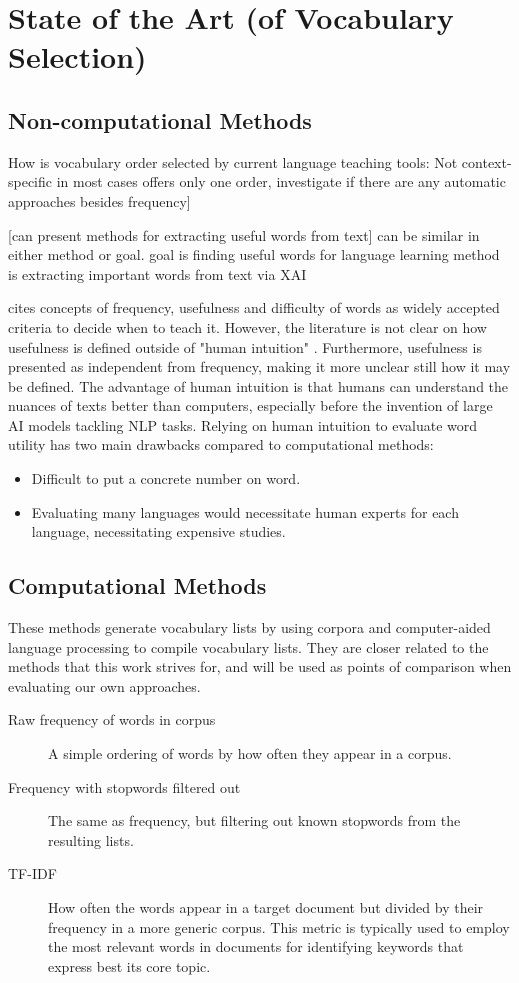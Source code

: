 \section{State of the Art (of Vocabulary Selection)} \label{sec:state-of-the-art-vocabulary-selection}
\subsection{Non-computational Methods}
How is vocabulary order selected by current language teaching tools:
Not context-specific in most cases
offers only one order,
investigate if there are any automatic approaches besides frequency]

[can present methods for extracting useful words from text]
can be similar in either method or goal.
goal is finding useful words for language learning
method is extracting important words from text via XAI

\cite{heChoosingWordsTeach2019} cites concepts of frequency, usefulness and difficulty of words as widely accepted criteria to decide when to teach it.
However, the literature is not clear on how usefulness is defined outside of "human intuition" \cite{heChoosingWordsTeach2019}.
Furthermore, usefulness is presented as independent from frequency, making it more unclear still how it may be defined.
The advantage of human intuition is that humans can understand the nuances of texts better than computers, especially before the invention of large AI models tackling NLP tasks.
Relying on human intuition to evaluate word utility has two main drawbacks compared to computational methods:
\begin{itemize}
	\item Difficult to put a concrete number on word.
	\item Evaluating many languages would necessitate human experts for each language, necessitating expensive studies.
\end{itemize}

\subsection{Computational Methods}
These methods generate vocabulary lists by using corpora and computer-aided language processing to compile vocabulary lists.
They are closer related to the methods that this work strives for, and will be used as points of comparison when evaluating our own approaches.

\begin{description}
	\item [Raw frequency of words in corpus]
	      A simple ordering of words by how often they appear in a corpus.
	\item [Frequency with stopwords filtered out]
	      The same as frequency, but filtering out known stopwords from the resulting lists.
	\item [TF-IDF]
	      How often the words appear in a target document but divided by their frequency in a more generic corpus.
	      This metric is typically used to employ the most relevant words in documents for identifying keywords that express best its core topic.
\end{description}

